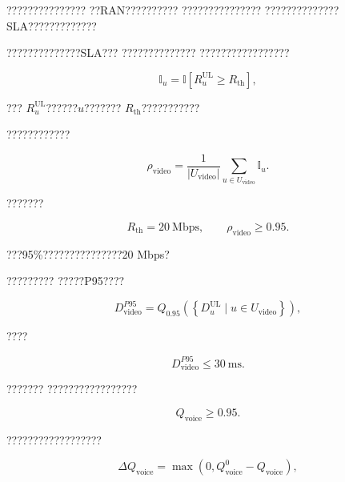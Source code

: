 ???????????????
??RAN??????????
???????????????
??????????????SLA?????????????

??????????????SLA???
??????????????
?????????????????

\begin{equation}
\mathbb{I}_u
=
\mathbb{I}
\left[
R_u^{\mathrm{UL}}
\geq
R_{\mathrm{th}}
\right],
\label{eq:video_user_threshold_indicator}
\end{equation}

???
$R_u^{\mathrm{UL}}$??????$u$???????
$R_{\mathrm{th}}$???????????

????????????

\begin{equation}
\rho_{\mathrm{video}}
=
\frac{1}
{\left|U_{\mathrm{video}}\right|}
\sum_{u\in U_{\mathrm{video}}}
\mathbb{I}_u.
\label{eq:translated_video_satisfaction_ratio}
\end{equation}

???????

\begin{equation}
R_{\mathrm{th}}
=
20~\mathrm{Mbps},
\qquad
\rho_{\mathrm{video}}
\geq
0.95.
\label{eq:translated_video_throughput_sla}
\end{equation}

???95\%???????????????20 Mbps?

?????????
?????P95????

\begin{equation}
D_{\mathrm{video}}^{P95}
=
Q_{0.95}
\left(
\left\{
D_u^{\mathrm{UL}}
\mid
u\in U_{\mathrm{video}}
\right\}
\right),
\label{eq:translated_video_delay_p95}
\end{equation}

????

\begin{equation}
D_{\mathrm{video}}^{P95}
\leq
30~\mathrm{ms}.
\label{eq:translated_video_delay_sla}
\end{equation}

???????
?????????????????

\begin{equation}
Q_{\mathrm{voice}}
\geq
0.95.
\label{eq:translated_voice_quality_sla}
\end{equation}

??????????????????

\begin{equation}
\Delta Q_{\mathrm{voice}}
=
\max
\left(
0,
Q_{\mathrm{voice}}^{0}
-
Q_{\mathrm{voice}}
\right),
\label{eq:translated_voice_degradation}
\end{equation}

